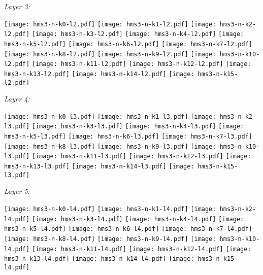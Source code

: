 \documentclass[11pt,a4paper]{article}
\begin{document}
\begin{flushleft}
\newpage
\emph{Layer 3:}

\texttt{[image: hms3-n-k0-l2.pdf]}
\texttt{[image: hms3-n-k1-l2.pdf]}
\texttt{[image: hms3-n-k2-l2.pdf]}
\texttt{[image: hms3-n-k3-l2.pdf]}
\texttt{[image: hms3-n-k4-l2.pdf]}
\texttt{[image: hms3-n-k5-l2.pdf]}
\texttt{[image: hms3-n-k6-l2.pdf]}
\texttt{[image: hms3-n-k7-l2.pdf]}
\texttt{[image: hms3-n-k8-l2.pdf]}
\texttt{[image: hms3-n-k9-l2.pdf]}
\texttt{[image: hms3-n-k10-l2.pdf]}
\texttt{[image: hms3-n-k11-l2.pdf]}
\texttt{[image: hms3-n-k12-l2.pdf]}
\texttt{[image: hms3-n-k13-l2.pdf]}
\texttt{[image: hms3-n-k14-l2.pdf]}
\texttt{[image: hms3-n-k15-l2.pdf]}

\bigskip
\emph{Layer 4:}

\texttt{[image: hms3-n-k0-l3.pdf]}
\texttt{[image: hms3-n-k1-l3.pdf]}
\texttt{[image: hms3-n-k2-l3.pdf]}
\texttt{[image: hms3-n-k3-l3.pdf]}
\texttt{[image: hms3-n-k4-l3.pdf]}
\texttt{[image: hms3-n-k5-l3.pdf]}
\texttt{[image: hms3-n-k6-l3.pdf]}
\texttt{[image: hms3-n-k7-l3.pdf]}
\texttt{[image: hms3-n-k8-l3.pdf]}
\texttt{[image: hms3-n-k9-l3.pdf]}
\texttt{[image: hms3-n-k10-l3.pdf]}
\texttt{[image: hms3-n-k11-l3.pdf]}
\texttt{[image: hms3-n-k12-l3.pdf]}
\texttt{[image: hms3-n-k13-l3.pdf]}
\texttt{[image: hms3-n-k14-l3.pdf]}
\texttt{[image: hms3-n-k15-l3.pdf]}

\bigskip
\emph{Layer 5:}

\texttt{[image: hms3-n-k0-l4.pdf]}
\texttt{[image: hms3-n-k1-l4.pdf]}
\texttt{[image: hms3-n-k2-l4.pdf]}
\texttt{[image: hms3-n-k3-l4.pdf]}
\texttt{[image: hms3-n-k4-l4.pdf]}
\texttt{[image: hms3-n-k5-l4.pdf]}
\texttt{[image: hms3-n-k6-l4.pdf]}
\texttt{[image: hms3-n-k7-l4.pdf]}
\texttt{[image: hms3-n-k8-l4.pdf]}
\texttt{[image: hms3-n-k9-l4.pdf]}
\texttt{[image: hms3-n-k10-l4.pdf]}
\texttt{[image: hms3-n-k11-l4.pdf]}
\texttt{[image: hms3-n-k12-l4.pdf]}
\texttt{[image: hms3-n-k13-l4.pdf]}
\texttt{[image: hms3-n-k14-l4.pdf]}
\texttt{[image: hms3-n-k15-l4.pdf]}


\end{flushleft}
\end{document}

